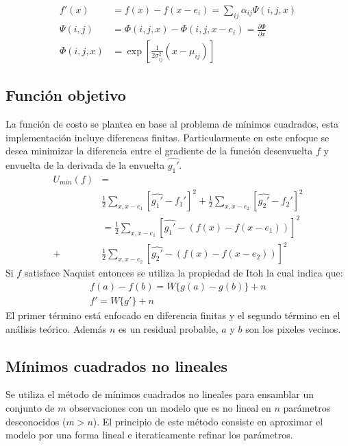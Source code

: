 \begin{equation} 
\begin{split}
f'(x) &=f(x) - f(x-e_i) = \sum_{ij} \alpha_{ij} \Psi(i,j,x)\\
\Psi(i,j) & = \Phi(i,j,x)- \Phi(i,j,x-e_i) = \frac{ \partial \Phi}{ \partial x} \\
\Phi(i,j, x)& = \exp \left [\frac{1}{2\sigma^2_{ij}}(x-\mu_{ij})\right ]
\end{split}
\end{equation}

\subsection{Función objetivo}
La función de costo se plantea en base al problema de mínimos cuadrados, esta implementación incluye diferencas finitas.
%
Particularmente en este enfoque se desea minimizar la diferencia entre el gradiente de la función desenvuelta $f$ y envuelta de la derivada de la envuelta $\widehat{g_1'}$.
\begin{equation}
\begin{split}
 U_{min}(f) &= \\
& \frac{1}{2} \sum_{x,x-e_1}[ \widehat{g_1'}-f_1']^2  + \frac{1}{2}  \sum_{x,x-e_2}[ \widehat{g_2'}-f_2']^2  \\ 
& = \frac{1}{2} \sum_{x,x-e_1}[ \widehat{g_1'}-(f(x)- f(x-e_1))]^2 \\  +
& \frac{1}{2}  \sum_{x,x-e_2}[ \widehat{g_2'}-(f(x)- f(x-e_2))]^2
\end{split}
\end{equation}
Si $f$ satisface Naquist entonces se utiliza la propiedad de Itoh la cual indica que:
\begin{equation}
\begin{split}
f(a) - f(b) = W\{ g(a) - g(b) \}+n\\
f' = W\{g'\} + n
\end{split}
\end{equation}
El primer término está enfocado en diferencia finitas y el segundo término en el análisis teórico. 
%
Además $n$ es un residual probable, $a$ y $b$ son los pixeles vecinos.


\subsection{M\'inimos cuadrados no lineales}
Se utiliza el método de mínimos cuadrados no lineales para ensamblar un conjunto de $m$ observaciones con un modelo que es no lineal en $n$ par\'ametros desconocidos ($m > n$). 
%
El principio de este método consiste en aproximar el modelo por una forma lineal e iteraticamente refinar los par\'ametros.



